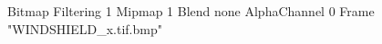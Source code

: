 {Bitmap
	{Filtering 1}
	{Mipmap 1}
	{Blend none}
	{AlphaChannel 0}
	{Frame "WINDSHIELD_x.tif.bmp"}
}
